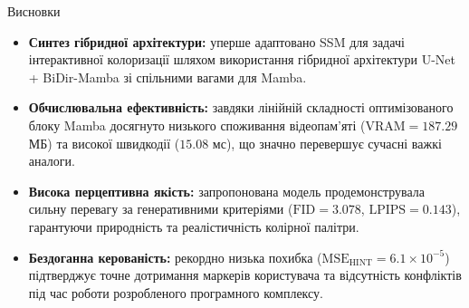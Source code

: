 \begin{frame}{Висновки}
    \begin{itemize}
        \item \textbf{Синтез гібридної архітектури:}
            уперше адаптовано SSM для задачі інтерактивної колоризації шляхом
            використання гібридної архітектури U-Net + BiDir-Mamba зі спільними вагами для Mamba.
        \item \textbf{Обчислювальна ефективність:}
            завдяки лінійній складності оптимізованого блоку Mamba досягнуто низького споживання відеопам'яті ($\mathrm{VRAM} = 187.29$ МБ)
            та високої швидкодії ($15.08$ мс), що значно перевершує сучасні важкі аналоги.
        \item \textbf{Висока перцептивна якість:}
            запропонована модель продемонструвала сильну перевагу
            за генеративними критеріями ($\mathrm{FID} = 3.078$, $\mathrm{LPIPS} = 0.143$),
            гарантуючи природність та реалістичність колірної палітри.
        \item \textbf{Бездоганна керованість:}
            рекордно низька похибка ($\mathrm{MSE}_{\mathrm{HINT}} = 6.1 \times 10^{-5}$) підтверджує точне дотримання маркерів користувача
            та відсутність конфліктів під час роботи розробленого програмного комплексу.
    \end{itemize}
\end{frame}